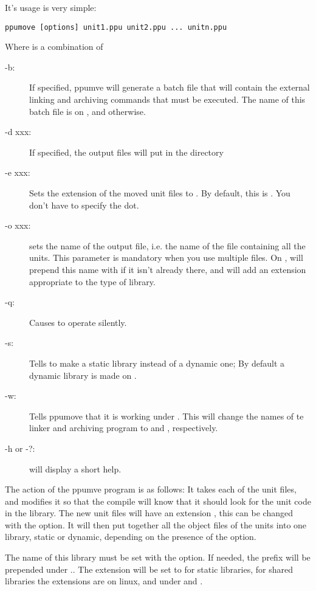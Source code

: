 \documentclass{report}
\begin{document}
It's usage is very simple:
\begin{verbatim}
ppumove [options] unit1.ppu unit2.ppu ... unitn.ppu
\end{verbatim}
Where  is a combination of
\begin{description}
\item[-b:\ ] If specified, ppumve will generate a batch file that will
contain the external linking and archiving commands that must be
executed. The name of this batch file is  on \linux, and
 otherwise.
\item[-d xxx:\ ] If specified, the output files will put in the directory
\item[-e xxx:\ ] Sets the extension of the moved unit files to .
By default, this is . You don't have to specify the dot.
\item[-o xxx:\ ] sets the name of the output file, i.e. the name of the file
containing all the units. This parameter is mandatory when you use multiple
files. On \linux,  will prepend this name with  if it isn't
already there, and will add an extension appropriate to the type of library.
\item [-q:\ ] Causes  to operate silently.
\item [-s:\ ] Tells  to make a static library instead of a
dynamic one; By default a dynamic library is made on \linux.
\item [-w:\ ] Tells ppumove that it is working under \windowsnt. This will
change the names of te linker and archiving program to  and
, respectively.
\item[-h or -?:\ ] will display a short help.
\end{description}

The action of the ppumve program is as follows:
It takes each of the unit files, and modifies it so that the compile will
know that it should look for the unit code in the library. The new unit
files will have an extension , this can be changed with the
 option. It will then put together all the object files of the units
into one library, static or dynamic, depending on the presence of the
 option.

The name of this library must be set with the  option.
If needed, the prefix  will be prepended under \linux..
The extension will be set to  for static libraries,
for shared libraries the extensions are  on linux, and 
under \windowsnt and \ostwo.
\end{document}
